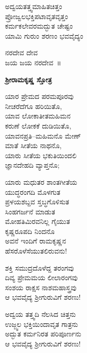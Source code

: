 
\begin{myquote}
ಅದ್ವಯತತ್ತ್ವಮಾಹಿತಚಿತ್ತಂ\\ಪ್ರೋಜ್ವಲಭಕ್ತಿಪಟಾವೃತವೃತ್ತಂ\\ಕರ್ಮಕಲೇವರಮದ್ಭುತ ಚೇಷ್ಟಂ\\ಯಾಮಿ ಗುರುಂ ಶರಣಂ ಭವವೈದ್ಯಂ
\end{myquote}


\begin{myquote}
ನರದೇವ ದೇವ\\ಜಯ ಜಯ ನರದೇವ~॥
\end{myquote}

\begin{center}
\textbf{ಶ‍್ರೀರಾಮಕೃಷ್ಣ ಸ್ತೋತ್ರ}
\end{center}

\begin{myquote}
ಯಾರ ಪ್ರೇಮದ ಪರಮಪೂರವು\\ನೀಚರೆದೆಗೂ ಹರಿಯಿತೊ,\\ಯಾವ ಲೋಕಾತೀತಮಹಿಮನ\\ಕರುಣೆ ಲೋಕಕೆ ದುಡಿಯಿತೊ,\\ಯಾವನಪ್ರತಿ–ಮಹಿಮನೊ ಮೇಣ್\\ಮಾತೆ ಸೀತೆಯ ನಾಥನೊ,\\ಯಾರು ಸೀತೆಯ ಭಕುತಿಯಿಂದಲಿ\\ಜ್ಞಾನದೇಹದಿ ವ್ಯಾಪ್ತನೊ;
\end{myquote}

\begin{myquote}
ಯಾರು ಮಧುತರ ಶಾಂತಗೀತೆಯ\\ಯುದ್ಧರಂಗದಿ ಮೊಳಗುತ\\ಪ್ರಳಯಶಬ್ದವ ಸ್ತಬ್ಧಗೊಳಿಸುತ\\ಸಿಂಹಗರ್ಜನೆ ಮಾಡುತ\\ಮೋಹತಿಮಿರವನಿಲ್ಲ ಗೈಯುತ\\ಕೃಷ್ಣರೂಪದಿ ನಿಂದನೊ\\ಅವನೆ ಇಂದಿಗೆ ರಾಮಕೃಷ್ಣನ\\ಹೆಸರೊಳೆಸೆಯುತಲಿರುವನು!
\end{myquote}

\begin{myquote}
ಶಕ್ತಿ ಸಮುದ್ರದೊಳೆದ್ದ ತರಂಗವು\\ದಿವ್ಯ ಪ್ರೇಮಮಯ ಲೀಲಾರಂಗವು\\ಸಂಶಯ ರಾಕ್ಷಸ ನಾಶಮಹಾಸ್ತ್ರವು\\ಆ ಭವವೈದ್ಯ ಶ‍್ರೀಗುರುವಿಗೆ ಶರಣು!
\end{myquote}

\begin{myquote}
ಅದ್ವಯ ತತ್ತ್ವದಿ ನೆಲಸಿದ ಚಿತ್ತನು\\ಉಜ್ಜ್ವಲ ಭಕ್ತಿಯಿಂದಾವೃತ ಗಾತ್ರನು\\ಅದ್ಭುತ ಕರ್ಮನಿರತ ಪರಿಪೂರ್ಣನು\\ಆ ಭವವೈದ್ಯ ಶ‍್ರೀಗುರುವಿಗೆ ಶರಣು!
\end{myquote}

